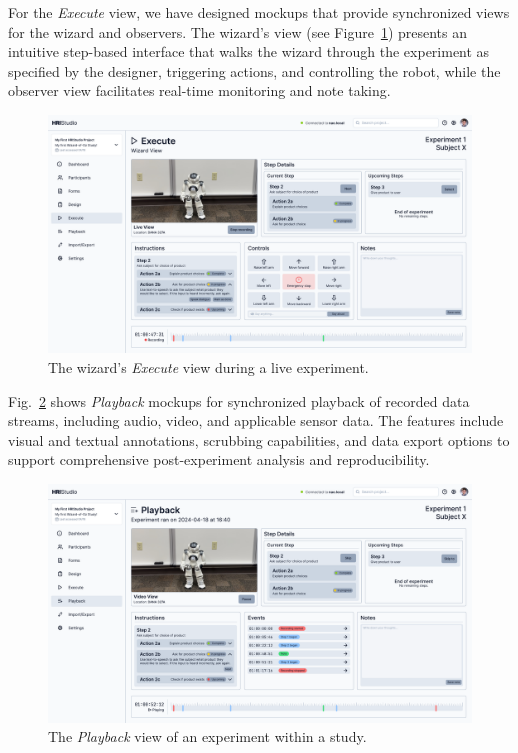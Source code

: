 \documentclass[letterpaper, 10 pt, conference]{ieeeconf}
\begin{document}
For the \emph{Execute} view, we have designed mockups that provide synchronized views for the wizard and observers. The wizard's view (see Figure~\ref{fig:execute}) presents an intuitive step-based interface that walks the wizard through the experiment as specified by the designer, triggering actions, and controlling the robot, while the observer view facilitates real-time monitoring and note taking.

\begin{figure}
\vskip -0.3cm
    \centering
        \includegraphics[width=0.35\paperwidth]{assets/mockups/execute}
         \vskip -0.3cm
        \caption{The wizard's \emph{Execute} view during a live experiment.}
        \label{fig:execute}
\end{figure}

Fig.~\ref{fig:playback} shows \emph{Playback} mockups for synchronized playback of recorded data streams, including audio, video, and applicable sensor data. The features include visual and textual annotations, scrubbing capabilities, and data export options to support comprehensive post-experiment analysis and reproducibility.

\begin{figure}
    \centering
        \includegraphics[width=0.35\paperwidth]{assets/mockups/playback}
        \vskip -0.3cm
        \caption{The \emph{Playback} view of an experiment within a study.}
        \label{fig:playback}
    \vskip -0.4cm
\end{figure}
\end{document}
